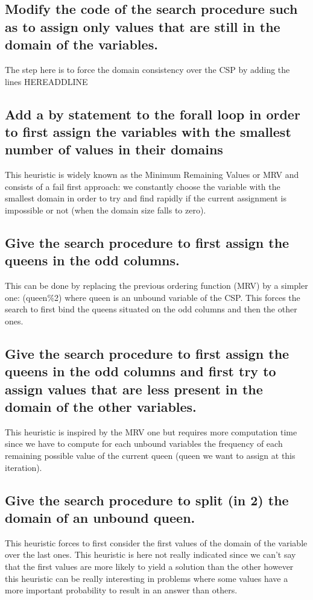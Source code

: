 \documentclass[a4paper ,12pt,french]{article}
\begin{document}
\subsection{Modify the code of the search procedure such as to assign only values that are still in the domain of the variables.}
The step here is to force the domain consistency over the CSP by adding the lines HEREADDLINE
\subsection{Add a by statement to the forall loop in order to first assign the variables with the smallest number of values in their domains}
This heuristic is widely known as the Minimum Remaining Values or MRV and consists of a fail first approach: we constantly choose the variable with the smallest domain in order to try and find rapidly if the current assignment is impossible or not (when the domain size falls to zero). 
\subsection{Give the search procedure to first assign the queens in the odd columns.}
This can be done by replacing the previous ordering function (MRV) by a simpler one: (queen\%2) where queen is an unbound variable of the CSP. This forces the search to first bind the queens situated on the odd columns and then the other ones. 
\subsection{Give the search procedure to first assign the queens in the odd columns and first try to assign values that are less present in the domain of the other variables.}
This heuristic is inspired by the MRV one but requires more computation time since we have to compute for each unbound variables the frequency of each remaining possible value of the current queen (queen we want to assign at this iteration).
\subsection{Give the search procedure to split (in 2) the domain of an unbound queen.}
This heuristic forces to first consider the first values of the domain of the variable over the last ones. This heuristic is here not really indicated since we can't say that the first values are more likely to yield a solution than the other however this heuristic can be really interesting in problems where some values have a more important probability to result in an answer than others.
\end{document}
